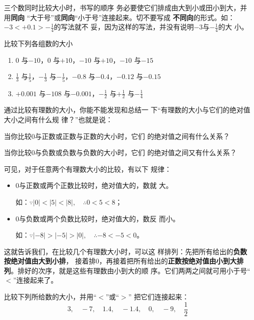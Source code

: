 \begin{rmk}
	三个数同时比较大小时，书写的顺序
	务必要使它们排成由大到小或田小到大，并用\textbf{同向}
	“大于号”或\textbf{同向}“小于号”连接起来。切不要写成
	\textbf{不同向}的形式。如：$-3<+0.1>-\frac{1}{4}$的写法就不
	妥，因为这样的写法，并没有说明$-3$与$-\frac{1}{4}$的大
	小。
\end{rmk}

\begin{ex}
	比较下列各组数的大小
	\begin{enumerate}
		\item $0$ 与$-10$，\quad $0$ 与$+10$，\quad $-10$ 与$+10$，\quad $-10$ 与$-15$
		\item $\frac{1}{3}$ 与$\frac{1}{5}$，\quad $-\frac{1}{3}$ 与$-\frac{1}{5}$，\quad $-0.8$ 与$-0.4$，\quad $-0.12$ 与$-0.15$
		\item $+0.001$ 与$-108$ 与$-0.001$，\quad $-\frac{1}{2}$ 与$+\frac{1}{2}$ 与$-\frac{1}{4}$
	\end{enumerate}
\end{ex}

通过比较有理数的大小，你能不能发现和总结一
下“有理数的大小与它们的绝对值大小之间有什么规
律？”也就是说：

当你比较0与正数或正数与正数的大小时，它们
的绝对值之间有什么关系？

当你比较0与负数或负数与负数的大小时，它们
的绝对值之间又有什么关系？

可见，对于任意两个有理数大小的比较，有以下
规律：
\begin{itemize}
	\item 0与正数或两个正数比较时，绝对值大的，数就
	大。
	
	如：$\because |0|<|5|<|8|, \quad \therefore 0<5<8$；
	\item 0与负数或两个负数比较时，绝对值大的，数反
	而小。
	
	如：$\because |-8|>|-5|>|0|, \quad \therefore -8<-5<0$。
\end{itemize}

这就告诉我们，在比较几个有理数大小时，可以这
样排列：先把所有给出的\textbf{负数按绝对值由大到小排}，
接着排0，再接着把所有给出的\textbf{正数按绝对值由小到大排
	列}。排好的次序，就是这些有理数由小到大的顺
序。它们两两之间就可用小于号“$<$”连接起来了。

\begin{example}
	比较下列所给数的大小，并用“$<$”或“$>$”
	把它们连接起来：   
	\[3,\quad -7,\quad 1.4,\quad -1.4,\quad 0,\quad -9,\quad \frac{1}{2} \]
\end{example}


